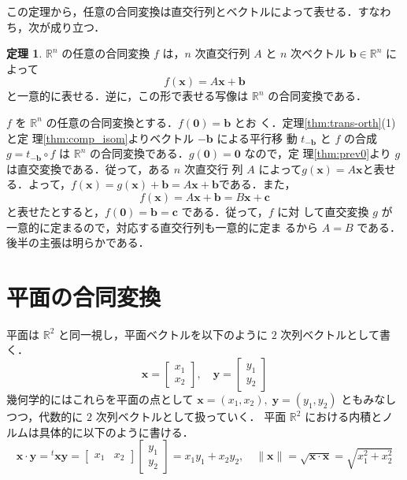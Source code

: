 \documentclass[11pt, uplatex, dvipdfmx, titlepage]{jsarticle}
\makeatletter
\renewenvironment{proof}[1][\proofname]{\par
  \pushQED{\qed}%
  \normalfont \topsep6\p@\@plus6\p@\relax
  \trivlist
  \item[\hskip\labelsep
         \bfseries
    {#1}]\ignorespaces
}{%
  \popQED\endtrivlist\@endpefalse
}
\theoremstyle{definition}
\newtheorem{theorem}{定理}[section]
\renewcommand{\proofname}{\textbf{証明}}
\makeatother
\begin{document}
この定理から，任意の合同変換は直交行列とベクトルによって表せる．すなわち，次が成り立つ．

\begin{theorem}\label{thm:affine_rep}
  $\mathbb{R}^n$ の任意の合同変換 $f$ は，$n$ 次直交行列 $A$
  と $n$ 次ベクトル $\bm{b} \in \mathbb{R}^n$ によって
  \[
    f(\bm{x}) = A\bm{x} + \bm{b}
  \]
  と一意的に表せる．逆に，この形で表せる写像は $\mathbb{R}^n$ の合同変換である．
\end{theorem}


\begin{proof}
  $f$ を $\mathbb{R}^n$ の任意の合同変換とする．$f(\bm{0})=\bm{b}$ とお
  く．定理\ref{thm:trans-orth}(1)と定
  理\ref{thm:comp_isom}よりベクトル $-\bm{b}$ による平行移
  動 $t_{-\bm{b}}$ と $f$ の合成 $g = t_{-\bm{b}} \circ
  f$ は $\mathbb{R}^n$ の合同変換である．$g(\bm{0})=\bm{0}$ なので，定
  理\ref{thm:prev0}より $g$は直交変換である．従って，ある $n$ 次直交行
  列 $A$
  によって$g(\bm{x})=A\bm{x}$と表せる．よって，$f(\bm{x}) =
  g(\bm{x})+\bm{b} = A\bm{x} + \bm{b}$である．また，
  \[
    f(\bm{x}) = A\bm{x}+\bm{b} = B\bm{x} + \bm{c}
  \]
  と表せたとすると，$f(\bm{0})=\bm{b}=\bm{c}$ である．従って，$f$ に対
  して直交変換 $g$ が一意的に定まるので，対応する直交行列も一意的に定ま
  るから $A=B$ である．後半の主張は明らかである．
\end{proof}

\newpage

\section{平面の合同変換}\label{sec:2dim}

平面は $\mathbb{R}^2$ と同一視し，平面ベクトルを以下のように $2$ 次列ベクトルとして書く．
\[
  \bm{x} = \left[
  \begin{array}{c}
    x_1\\
    x_2
  \end{array}
\right], \quad \bm{y}= \left[
  \begin{array}{c}
    y_1\\
    y_2
  \end{array}
\right] 
\]
幾何学的にはこれらを平面の点として $\bm{x}=(x_1,x_2), \;
\bm{y}=(y_1,y_2)$ ともみなしつつ，代数的に $2$ 次列ベクトルとして扱っていく．
平面 $\mathbb{R}^2$ における内積とノルムは具体的に以下のように書ける．
\[
  \bm{x} \cdot  \bm{y} = {}^{t}\bm{x} \bm{y} = \left[
    \begin{array}{cc}
      x_1 & x_2
    \end{array}
  \right] \left[
    \begin{array}{c}
      y_1\\
      y_2
    \end{array}
  \right] = x_1 y_1 + x_2 y_2, \quad \| \bm{x} \| = \sqrt{\bm{x} \cdot \bm{x}} = \sqrt{x_1^2+x_2^2}
\]
\end{document}
